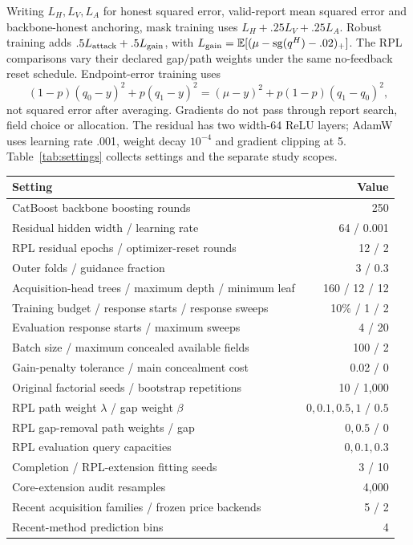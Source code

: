 \documentclass[11pt]{article}
\begin{document}
Writing $L_H,L_V,L_A$ for honest squared error, valid-report mean squared
error and backbone-honest anchoring, mask training uses
$L_H+.25L_V+.25L_A$. Robust training adds
$.5L_{\rm attack}+.5L_{\rm gain}$, with
$L_{\rm gain}=\mathbb E[(\mu-\operatorname{sg}(q^H)-.02)_+]$.
The RPL comparisons vary their declared gap/path weights under the same
no-feedback reset schedule. Endpoint-error training uses
\[
 (1-p)(q_0-y)^2+p(q_1-y)^2
 =(\mu-y)^2+p(1-p)(q_1-q_0)^2,
\]
not squared error after averaging. Gradients do not pass through report search,
field choice or allocation. The residual has two width-64 ReLU layers; AdamW
uses learning rate .001, weight decay $10^{-4}$ and gradient clipping at 5.
Table~\ref{tab:settings} collects settings and the separate study scopes.

\begin{table}[htbp]\centering\small
\begin{tabular}{lr}\toprule
Setting & Value\\\midrule
CatBoost backbone boosting rounds ~\cite{catboost} & 250\\
Residual hidden width / learning rate & 64 / 0.001\\
RPL residual epochs / optimizer-reset rounds & 12 / 2\\
Outer folds / guidance fraction & 3 / 0.3\\
Acquisition-head trees / maximum depth / minimum leaf & 160 / 12 / 12\\
Training budget / response starts / response sweeps & 10\% / 1 / 2\\
Evaluation response starts / maximum sweeps & 4 / 20\\
Batch size / maximum concealed available fields & 100 / 2\\
Gain-penalty tolerance / main concealment cost & 0.02 / 0\\
Original factorial seeds / bootstrap repetitions & 10 / 1,000\\
RPL path weight $\lambda$ / gap weight $\beta$ & $0,0.1,0.5,1$ / $0.5$\\
RPL gap-removal path weights / gap & $0,0.5$ / $0$\\
RPL evaluation query capacities & $0,0.1,0.3$\\
Completion / RPL-extension fitting seeds & 3 / 10\\
Core-extension audit resamples & 4,000\\
Recent acquisition families / frozen price backends & 5 / 2\\
Recent-method prediction bins & 4\\

\end{tabular}
\end{table}
\end{document}
